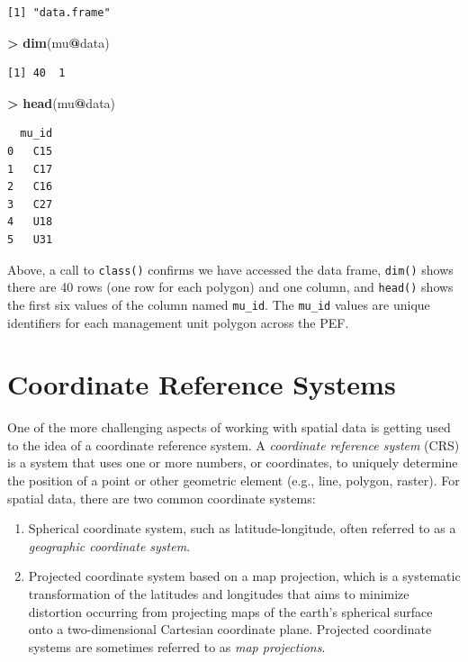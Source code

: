 \documentclass[]{krantz}
\makeatletter
\newenvironment{Shaded}{\begin{snugshade}}{\end{snugshade}}
\newcommand{\KeywordTok}[1]{\textcolor[rgb]{0.27,0.27,0.27}{\textbf{#1}}}
\newcommand{\NormalTok}[1]{#1}
\newcommand{\OperatorTok}[1]{\textcolor[rgb]{0.43,0.43,0.43}{\textbf{#1}}}
\newcommand{\StringTok}[1]{\textcolor[rgb]{0.5,0.5,0.5}{#1}}
\providecommand{\tightlist}{%
  \setlength{\itemsep}{0pt}\setlength{\parskip}{0pt}}
\newenvironment{kframe}{%
\medskip{}
\setlength{\fboxsep}{.8em}
 \def\at@end@of@kframe{}%
 \ifinner\ifhmode%
  \def\at@end@of@kframe{\end{minipage}}%
  \begin{minipage}{\columnwidth}%
 \fi\fi%
 \def\FrameCommand##1{\hskip\@totalleftmargin \hskip-\fboxsep
 \colorbox{shadecolor}{##1}\hskip-\fboxsep
     \hskip-\linewidth \hskip-\@totalleftmargin \hskip\columnwidth}%
 \MakeFramed {\advance\hsize-\width
   \@totalleftmargin\z@ \linewidth\hsize
   \@setminipage}}%
 {\par\unskip\endMakeFramed%
 \at@end@of@kframe}
\renewenvironment{Shaded}{\begin{kframe}}{\end{kframe}}
\makeatother
\begin{document}
\begin{verbatim}
[1] "data.frame"
\end{verbatim}

\begin{Shaded}
\begin{Highlighting}[]
\OperatorTok{>}\StringTok{ }\KeywordTok{dim}\NormalTok{(mu}\OperatorTok{@}\NormalTok{data)}
\end{Highlighting}
\end{Shaded}

\begin{verbatim}
[1] 40  1
\end{verbatim}

\begin{Shaded}
\begin{Highlighting}[]
\OperatorTok{>}\StringTok{ }\KeywordTok{head}\NormalTok{(mu}\OperatorTok{@}\NormalTok{data)}
\end{Highlighting}
\end{Shaded}

\begin{verbatim}
  mu_id
0   C15
1   C17
2   C16
3   C27
4   U18
5   U31
\end{verbatim}

Above, a call to \texttt{class()} confirms we have accessed the data frame, \texttt{dim()} shows there are 40 rows (one row for each polygon) and one column, and \texttt{head()} shows the first six values of the column named \texttt{mu\_id}. The \texttt{mu\_id} values are unique identifiers for each management unit polygon across the PEF.

\hypertarget{coordinate-reference-systems}{%
\section{Coordinate Reference Systems}\label{coordinate-reference-systems}}

One of the more challenging aspects of working with spatial data is getting used to the idea of a coordinate reference system. A \emph{coordinate reference system} (CRS) is a system that uses one or more numbers, or coordinates, to uniquely determine the position of a point or other geometric element (e.g., line, polygon, raster). For spatial data, there are two common coordinate systems:

\begin{enumerate}
\def\labelenumi{\arabic{enumi}.}
\tightlist
\item
  Spherical coordinate system, such as latitude-longitude, often referred to as a \emph{geographic coordinate system}.
\item
  Projected coordinate system based on a map projection, which is a systematic transformation of the latitudes and longitudes that aims to minimize distortion occurring from projecting maps of the earth's spherical surface onto a two-dimensional Cartesian coordinate plane. Projected coordinate systems are sometimes referred to as \emph{map projections}.
\end{enumerate}
\end{document}
